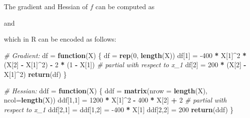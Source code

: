\documentclass[
]{book}
\newenvironment{Shaded}{\begin{snugshade}}{\end{snugshade}}
\newcommand{\CommentTok}[1]{\textcolor[rgb]{0.56,0.35,0.01}{\textit{#1}}}
\newcommand{\ControlFlowTok}[1]{\textcolor[rgb]{0.13,0.29,0.53}{\textbf{#1}}}
\newcommand{\DataTypeTok}[1]{\textcolor[rgb]{0.13,0.29,0.53}{#1}}
\newcommand{\DecValTok}[1]{\textcolor[rgb]{0.00,0.00,0.81}{#1}}
\newcommand{\KeywordTok}[1]{\textcolor[rgb]{0.13,0.29,0.53}{\textbf{#1}}}
\newcommand{\NormalTok}[1]{#1}
\newcommand{\OperatorTok}[1]{\textcolor[rgb]{0.81,0.36,0.00}{\textbf{#1}}}
\newcommand{\StringTok}[1]{\textcolor[rgb]{0.31,0.60,0.02}{#1}}
\begin{document}
The gradient and Hessian of \(f\) can be computed as

and

which in R can be encoded as follows:

\begin{Shaded}
\begin{Highlighting}[]
\CommentTok{# Gradient:}
\NormalTok{df =}\StringTok{ }\ControlFlowTok{function}\NormalTok{(X) \{}
\NormalTok{  df =}\StringTok{ }\KeywordTok{rep}\NormalTok{(}\DecValTok{0}\NormalTok{, }\KeywordTok{length}\NormalTok{(X))}
\NormalTok{  df[}\DecValTok{1}\NormalTok{] =}\StringTok{ }\DecValTok{-400} \OperatorTok{*}\StringTok{ }\NormalTok{X[}\DecValTok{1}\NormalTok{]}\OperatorTok{^}\DecValTok{2} \OperatorTok{*}\StringTok{ }\NormalTok{(X[}\DecValTok{2}\NormalTok{] }\OperatorTok{-}\StringTok{ }\NormalTok{X[}\DecValTok{1}\NormalTok{]}\OperatorTok{^}\DecValTok{2}\NormalTok{) }\OperatorTok{-}\StringTok{ }\DecValTok{2} \OperatorTok{*}\StringTok{ }\NormalTok{(}\DecValTok{1} \OperatorTok{-}\StringTok{ }\NormalTok{X[}\DecValTok{1}\NormalTok{]) }\CommentTok{# partial with respect to x_1}
\NormalTok{  df[}\DecValTok{2}\NormalTok{] =}\StringTok{ }\DecValTok{200} \OperatorTok{*}\StringTok{ }\NormalTok{(X[}\DecValTok{2}\NormalTok{] }\OperatorTok{-}\StringTok{ }\NormalTok{X[}\DecValTok{1}\NormalTok{]}\OperatorTok{^}\DecValTok{2}\NormalTok{)}
  \KeywordTok{return}\NormalTok{(df)}
\NormalTok{\}}

\CommentTok{# Hessian:}
\NormalTok{ddf =}\StringTok{ }\ControlFlowTok{function}\NormalTok{(X) \{}
\NormalTok{  ddf =}\StringTok{ }\KeywordTok{matrix}\NormalTok{(}\DataTypeTok{nrow =} \KeywordTok{length}\NormalTok{(X), }\DataTypeTok{ncol=}\KeywordTok{length}\NormalTok{(X))}
\NormalTok{  ddf[}\DecValTok{1}\NormalTok{,}\DecValTok{1}\NormalTok{] =}\StringTok{ }\DecValTok{1200} \OperatorTok{*}\StringTok{ }\NormalTok{X[}\DecValTok{1}\NormalTok{]}\OperatorTok{^}\DecValTok{2} \OperatorTok{-}\StringTok{ }\DecValTok{400} \OperatorTok{*}\StringTok{ }\NormalTok{X[}\DecValTok{2}\NormalTok{] }\OperatorTok{+}\StringTok{ }\DecValTok{2} \CommentTok{# partial with respect to x_1}
\NormalTok{  ddf[}\DecValTok{2}\NormalTok{,}\DecValTok{1}\NormalTok{] =}\StringTok{ }\NormalTok{ddf[}\DecValTok{1}\NormalTok{,}\DecValTok{2}\NormalTok{] =}\StringTok{ }\DecValTok{-400} \OperatorTok{*}\StringTok{ }\NormalTok{X[}\DecValTok{1}\NormalTok{]}
\NormalTok{  ddf[}\DecValTok{2}\NormalTok{,}\DecValTok{2}\NormalTok{] =}\StringTok{ }\DecValTok{200}
  \KeywordTok{return}\NormalTok{(ddf)}
\NormalTok{\}}
\end{Highlighting}
\end{Shaded}
\end{document}
